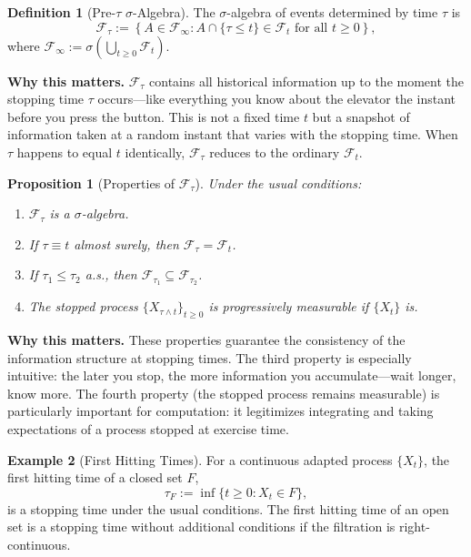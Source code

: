 \documentclass[11pt,a4paper,openany]{book}
\theoremstyle{definition}
\newtheorem{definition}{Definition}[chapter]
\newtheorem{example}[definition]{Example}
\theoremstyle{plain}
\newtheorem{proposition}[theorem]{Proposition}
\theoremstyle{remark}
\newcommand{\1}{\mathbbm{1}}
\newcommand{\F}{\mathcal{F}}
\begin{document}
\begin{definition}[Pre-$\tau$ $\sigma$-Algebra]
The $\sigma$-algebra of events determined by time $\tau$ is
\[
\F_{\tau} := \left\{A \in \F_{\infty} : A \cap \{\tau \leq t\} \in \F_{t} \text{ for all } t \geq 0\right\},
\]
where $\F_{\infty} := \sigma(\bigcup_{t \geq 0} \F_{t})$.
\end{definition}

\medskip
\noindent\textbf{Why this matters.} $\mathcal{F}_\tau$ contains all historical information up to the moment the stopping time $\tau$ occurs---like everything you know about the elevator the instant before you press the button. This is not a fixed time $t$ but a snapshot of information taken at a random instant that varies with the stopping time. When $\tau$ happens to equal $t$ identically, $\mathcal{F}_\tau$ reduces to the ordinary $\mathcal{F}_t$.

\begin{proposition}[Properties of $\F_{\tau}$]
Under the usual conditions:
\begin{enumerate}[label=(\arabic*)]
    \item $\F_{\tau}$ is a $\sigma$-algebra.
    \item If $\tau \equiv t$ almost surely, then $\F_{\tau} = \F_{t}$.
    \item If $\tau_{1} \leq \tau_{2}$ a.s., then $\F_{\tau_{1}} \subseteq \F_{\tau_{2}}$.
    \item The stopped process $\{X_{\tau \wedge t}\}_{t \geq 0}$ is progressively measurable if $\{X_{t}\}$ is.
\end{enumerate}
\end{proposition}

\medskip
\noindent\textbf{Why this matters.} These properties guarantee the consistency of the information structure at stopping times. The third property is especially intuitive: the later you stop, the more information you accumulate---wait longer, know more. The fourth property (the stopped process remains measurable) is particularly important for computation: it legitimizes integrating and taking expectations of a process stopped at exercise time.

\begin{example}[First Hitting Times]
For a continuous adapted process $\{X_{t}\}$, the first hitting time of a closed set $F$,
\[
\tau_{F} := \inf\{t \geq 0 : X_{t} \in F\},
\]
is a stopping time under the usual conditions. The first hitting time of an open set is a stopping time without additional conditions if the filtration is right-continuous.
\end{example}
\end{document}
